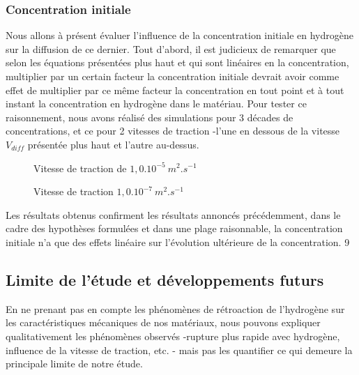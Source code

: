\documentclass[a4paper, french, 11pt]{article}
\begin{document}
    \subsubsection{Concentration initiale}

    Nous allons à présent évaluer l'influence de la concentration initiale en hydrogène sur la diffusion de ce dernier.
    Tout d'abord, il est judicieux de remarquer que selon les équations présentées plus haut et qui sont linéaires en la concentration, multiplier par un certain facteur la concentration initiale devrait avoir comme effet de multiplier par ce même facteur la concentration en tout point et à tout instant la concentration en hydrogène dans le matériau.
    Pour tester ce raisonnement, nous avons réalisé des simulations pour 3 décades de concentrations, et ce pour 2 vitesses de traction -l'une en dessous de la vitesse \(V_{diff}\) présentée plus haut et l'autre au-dessus.

    \begin{figure}[ht]
        \caption{Vitesse de traction de \(1,0.10^{-5}\:m^2.s^{-1}\) }
    \end{figure}    

    \begin{figure}[ht]
        \caption{Vitesse de traction \(1,0.10^{-7}\:m^2.s^{-1}\) }
    \end{figure}    

    Les résultats obtenus confirment les résultats annoncés précédemment, dans le cadre des hypothèses formulées et dans une plage raisonnable, la concentration initiale n'a que des effets linéaire sur l'évolution ultérieure de la concentration.
9
    \subsection{Limite de l'étude et développements futurs}

    En ne prenant pas en compte les phénomènes de rétroaction de l'hydrogène sur les caractéristiques mécaniques de nos matériaux, nous pouvons expliquer qualitativement	les phénomènes observés -rupture plus rapide avec hydrogène, influence de la vitesse de traction, etc. - mais pas les quantifier ce qui demeure la principale limite de notre étude. 
\end{document}
